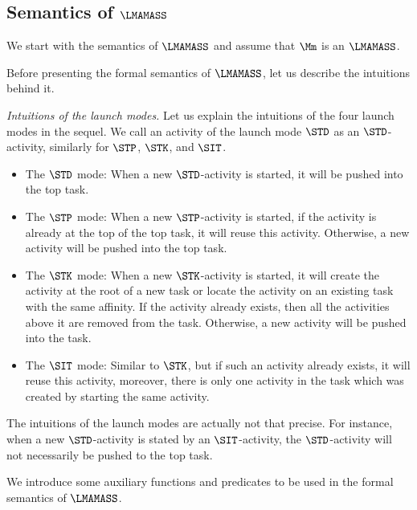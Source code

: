 \subsection{Semantics of $\LMAMASS$}

We start with the semantics of $\LMAMASS$ and assume that $\Mm$ is an $\LMAMASS$. 

Before presenting the formal semantics of $\LMAMASS$, let us describe the intuitions behind it.

%
\emph{Intuitions of the launch modes.}  Let us explain the intuitions of the four launch modes in the sequel. 
We call an activity of the launch mode $\STD$ as an $\STD$-activity, similarly for $\STP$, $\STK$, and $\SIT$. 
\begin{itemize}
	\item The $\STD$ mode: When a new $\STD$-activity is started, it will be pushed into the top task. 
	\item The $\STP$ mode: When a new $\STP$-activity is started, if the activity is already at the top of the top task, it will reuse this activity. Otherwise, a new activity will be pushed into the top task.
	\item The $\STK$ mode: When a new $\STK$-activity is started, it will create the activity at the root of a new task or locate the activity on an existing task with the same affinity. If the activity already exists, then all the activities above it are removed from the task. Otherwise, a new activity will be pushed into the task.
	\item The $\SIT$ mode: 
	Similar to $\STK$, but if such an activity already exists, it will reuse this activity, moreover, there is only one activity in the task which was created by starting the same activity.
\end{itemize}

The intuitions of the launch modes are actually not that precise. For instance, when a new $\STD$-activity is stated by an $\SIT$-activity, the $\STD$-activity will not necessarily be pushed to the top task. 

We introduce some auxiliary functions and predicates to be used in the formal semantics of $\LMAMASS$.

	
